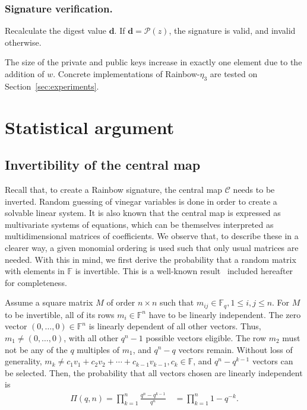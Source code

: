 \documentclass[draft, 12pt, a4paper, oneside]{memoir}
\theoremstyle{definition}
\begin{document}
\subsubsection{Signature verification.}

Recalculate the digest value $\mathbf{d}$. If $\mathbf{d} = \mathcal{P}(z)$,
the signature is valid, and invalid otherwise.

The size of the private and public keys increase in exactly one element due to
the addition of $w$. Concrete implementations of Rainbow-$\eta_{3}$ are tested on
Section~\ref{sec:experiments}.

\section{Statistical argument}

\subsection{Invertibility of the central map}\label{subsec:invert}

Recall that, to create a Rainbow signature, the central map $\mathcal{C}$ needs
to be inverted. Random guessing of vinegar variables is done in order to create
a solvable linear system. It is also known that the central map is expressed as
multivariate systems of equations, which can be themselves interpreted as
multidimensional matrices of coefficients. We observe that, to describe these in a
clearer way, a given monomial ordering is used such that only usual matrices
are needed. With this in mind, we first derive the probability that a random
matrix with elements in $\mathbb{F}$ is invertible. This is a well-known
result~\cite[Remark 13.2.14]{Mullen:2013} included hereafter for completeness.

Assume a square matrix $M$ of order $n \times n$ such that
$m_{ij} \in \mathbb{F}_{q}, 1 \leq i, j \leq n$. For $M$ to be
invertible, all of its rows
$m_{i} \in \mathbb{F}^{n}$ have to be linearly independent. The zero vector
$(0, \dots, 0) \in \mathbb{F}^{n}$ is linearly dependent of all other vectors.
Thus, $m_{1} \neq (0, \dots, 0)$, with all other $q^{n} - 1$ possible vectors
eligible. The row $m_{2}$ must not be any of the $q$ multiples of $m_{1}$, and
$q^{n} - q$ vectors remain. Without loss of generality,
$m_{k} \ne c_{1} v_{1} + c_{2} v_{2} + \cdots + c_{k - 1} v_{k - 1},
c_{k} \in \mathbb{F}$, and $q^{n} - q^{k - 1}$ vectors can be selected. Then,
the probability that all vectors chosen are linearly independent is
\begin{align}
  \Pi(q, n) = \prod_{k = 1}^{n} \frac{q^{n} - q^{k - 1}}{q^{n}} \quad
    = \prod_{k = 1}^{n} 1 - q^{-k}.
\end{align}
\end{document}

